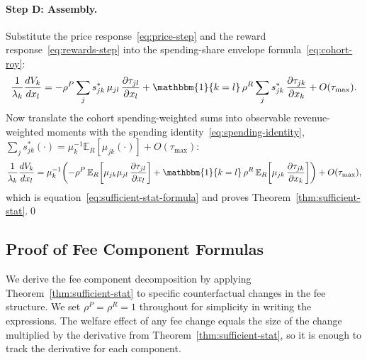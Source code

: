 \documentclass[main.tex]{subfiles}
\begin{document}

\paragraph{Step D: Assembly.}
Substitute the price response~\eqref{eq:price-step} and the reward response~\eqref{eq:rewards-step} into the spending-share envelope formula~\eqref{eq:cohort-roy}:
\[
\frac{1}{\lambda_k}\frac{dV_k}{dx_l}=-\rho^P\sum_j s^*_{jk}\,\mu_{jl}\,\frac{\partial\tau_{jl}}{\partial x_l}+\mathbbm{1}\{k=l\}\,\rho^R\sum_j s^*_{jk}\,\frac{\partial\tau_{jk}}{\partial x_k}+O(\tau_{\max}).
\]
Now translate the cohort spending-weighted sums into observable revenue-weighted moments with the spending identity~\eqref{eq:spending-identity}, $\sum_j s^*_{jk}(\cdot)=\mu_k^{-1}\mathbb{E}_R[\mu_{jk}(\cdot)]+O(\tau_{\max})$:
\begin{equation}
\frac{1}{\lambda_k}\frac{dV_k}{dx_l}=\mu_k^{-1}\!\left(-\rho^P\,\mathbb{E}_R\!\left[\mu_{jk}\mu_{jl}\,\frac{\partial\tau_{jl}}{\partial x_l}\right]+\mathbbm{1}\{k=l\}\,\rho^R\,\mathbb{E}_R\!\left[\mu_{jk}\,\frac{\partial\tau_{jk}}{\partial x_k}\right]\right)+O(\tau_{\max}),
\end{equation}
which is equation~\eqref{eq:sufficient-stat-formula} and proves Theorem~\ref{thm:sufficient-stat}.\qed

\subsection{Proof of Fee Component Formulas}\label{subsec:fee-components}

We derive the fee component decomposition by applying Theorem~\ref{thm:sufficient-stat} to specific counterfactual changes in the fee structure.
We set $\rho^P=\rho^R=1$ throughout for simplicity in writing the expressions.
The welfare effect of any fee change equals the size of the change multiplied by the derivative from Theorem~\ref{thm:sufficient-stat}, so it is enough to track the derivative for each component.
\end{document}
